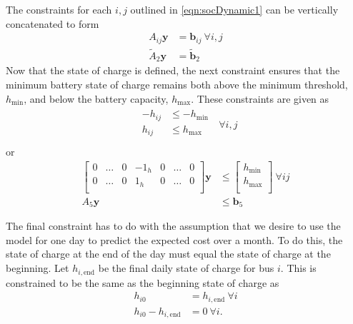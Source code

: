The constraints for each $i,j$ outlined in \eqref{eqn:socDynamic1} can be vertically concatenated to form
\begin{equation}\label{eqn:socDynamic3} \begin{aligned}
	A_{ij}\mathbf{y} &= \mathbf{b}_{ij} \ \forall i,j \\
	\tilde{A}_2\mathbf{y} &= \tilde{\mathbf{b}}_2
\end{aligned} \end{equation}
Now that the state of charge is defined, the next constraint ensures that the minimum battery state of charge remains both above the minimum threshold, $h_{\text{min}}$, and below the battery capacity, $h_{\text{max}}$. These constraints are given as
\begin{equation}
	\begin{array}{l} \begin{aligned}
		-h_{ij} &\le -h_{\text{min}} \\
		h_{ij} &\le h_{\text{max}} \\
	\end{aligned}\end{array} \ \forall i,j
\end{equation}
or 
\begin{equation} \begin{aligned}
	\begin{bmatrix}
		0 & \hdots & 0 & -1_{h} & 0 & \hdots & 0\\
		0 & \hdots & 0 &  1_{h} & 0 & \hdots & 0\\
	\end{bmatrix}\mathbf{y} & \le 
	\begin{bmatrix}
 		h_{\text{min}}\\
 		h_{\text{max}}\\	
	\end{bmatrix} \ \forall ij\\
		A_5\mathbf{y} &\le \mathbf{b}_5
\end{aligned} \end{equation}
\par The final constraint has to do with the assumption that we desire to use the model for one day to predict the expected cost over a month. To do this, the state of charge at the end of the day must equal the state of charge at the beginning. Let $h_{i,\text{end}}$ be the final daily state of charge for bus $i$. This is constrained to be the same as the beginning state of charge as
\begin{equation} \label{eqn:hEqual1} \begin{aligned}
	h_{i0} &= h_{i,\text{end}} \ \forall i \\
	h_{i0} - h_{i,\text{end}} &= 0 \ \forall i.  
\end{aligned} \end{equation}
